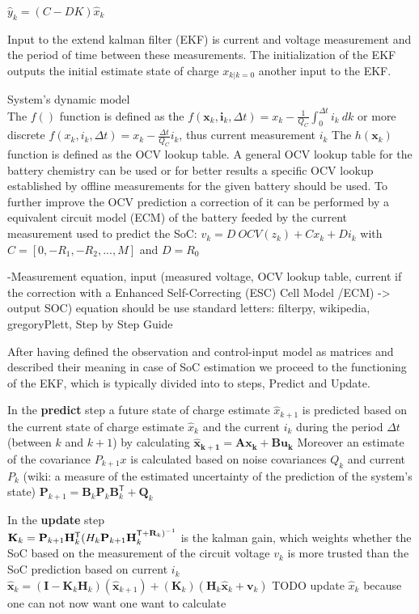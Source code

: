 $ {\hat{y}}_{k}=\left(C-DK\right){\hat{x}}_{k} $ 

Input to the extend kalman filter (EKF) is current and voltage measurement and the period of time between these measurements. The initialization of the EKF outputs the initial estimate state of charge  ${x}_{k|k=0} $ another input to the EKF. 

{System's dynamic model} \\
The $f() $ function is defined as the $ f({\boldsymbol {x}}_{k},{\boldsymbol {i}}_{k},\Delta{t}) = {x}_{k} - \frac{1}{{Q_{C}}}\int_{0}^{\Delta t} {i_{k}\ dk} $ or more discrete $f({x}_{k},{i}_{k},\Delta{t}) = {x}_{k} - \frac{\Delta t}{Q_{C}} i_{k} $, thus current measurement $ {i}_{k} $ 
The $h({\boldsymbol {x}}_{{k}})$ function is defined as the OCV lookup table. A general OCV lookup table for the battery chemistry can be used or for better results a specific OCV lookup established by offline measurements for  the given battery should be used. 
To further improve the OCV prediction a correction of it can be performed by a equivalent circuit model (ECM) of the battery feeded by the current measurement used to predict the SoC: 
$ {v}_{k} = {D} \ {OCV}({z}_{k}) + C {x}_{k}  +  D {i}_{k}  $ 
with $ C = [0, -R_1, -R_2, ..., M] $ and $ D = R_0 $

-Measurement equation, input (measured voltage, OCV lookup table, current if the correction with a Enhanced Self-Correcting (ESC) Cell Model /ECM) -> output SOC)
equation should be use standard letters: filterpy, wikipedia, gregoryPlett, Step by Step Guide

After having defined the observation and control-input model as matrices and described their meaning in case of SoC estimation we proceed to the functioning of the EKF, which is typically divided into to steps, Predict and Update. 

In the \textbf{predict} step a future state of charge estimate  $\hat x_{k+1}$ is predicted based on the current state of charge estimate $\hat x_k$ and the current $i_k$ during the period $\Delta t$ (between $k$ and $k+1$) by calculating $ \mathbf{\hat x_{k+1}=Ax_{k}+Bu_{k}} $ Moreover an estimate of the covariance $P_{k+1}x$ is calculated based on noise covariances $Q_k$ and current $P_k$ (wiki: a measure of the estimated uncertainty of the prediction of the system's state)  $\mathbf {P} _{k+1}=\mathbf {B} _{k}\mathbf {P} _{k}\mathbf {B} _{k}^{\textsf {T}}+\mathbf {Q} _{k} $

In the \textbf{update} step  \\
$ \mathbf {K} _{k}=\mathbf {P} _{k+1}\mathbf {H} _{k}^ \textsf {T} (  \mathbf \mathbf {H} _{k}\mathbf {P} _{k+1}\mathbf {H} _{k}^{\textsf {T}+\mathbf {R} _{k})^{-1}}$  is the kalman gain, which weights whether the SoC based on the measurement of the circuit voltage $v_k$ is more trusted than the SoC prediction based on current $i_k$ \\
$ {\hat {\mathbf {x} }}_{k}=(\mathbf {I} -\mathbf {K} _{k}\mathbf {H} _{k})({\hat {\mathbf {x} }}_{k+1})+(\mathbf {K} _{k})(\mathbf {H} _{k}\mathbf {\hat x} _{k}+\mathbf {v} _{k}) $ TODO update $\hat x_k$ because one can not now want one want to calculate\\  

